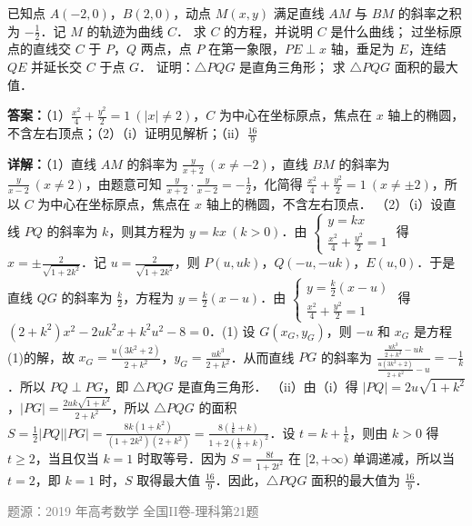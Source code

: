 \begin{question}
已知点 $A(-2,0)$，$B(2,0)$，动点 $M(x,y)$ 满足直线 $AM$ 与 $BM$ 的斜率之积为 $-\frac{1}{2}$．记 $M$ 的轨迹为曲线 $C$．
求 $C$ 的方程，并说明 $C$ 是什么曲线；
过坐标原点的直线交 $C$ 于 $P$，$Q$ 两点，点 $P$ 在第一象限，$PE\perp x$ 轴，垂足为 $E$，连结 $QE$ 并延长交 $C$ 于点 $G$．
证明：$\triangle PQG$ 是直角三角形；
求 $\triangle PQG$ 面积的最大值．
\begin{solution}
\textbf{答案：}（1）$\frac{x^2}{4}+\frac{y^2}{2}=1\ (|x|\neq 2)$，$C$ 为中心在坐标原点，焦点在 $x$ 轴上的椭圆，不含左右顶点；（2）（i）证明见解析；（ii）$\frac{16}{9}$

\textbf{详解：}（1）直线 $AM$ 的斜率为 $\frac{y}{x+2}\ (x\neq -2)$，直线 $BM$ 的斜率为 $\frac{y}{x-2}\ (x\neq 2)$，由题意可知 $\frac{y}{x+2}\cdot\frac{y}{x-2}=-\frac{1}{2}$，化简得 $\frac{x^2}{4}+\frac{y^2}{2}=1\ (x\neq\pm 2)$，所以 $C$ 为中心在坐标原点，焦点在 $x$ 轴上的椭圆，不含左右顶点．
（2）（i）设直线 $PQ$ 的斜率为 $k$，则其方程为 $y=kx\ (k>0)$．由 $\begin{cases} y=kx \\ \frac{x^2}{4}+\frac{y^2}{2}=1 \end{cases}$ 得 $x=\pm\frac{2}{\sqrt{1+2k^2}}$．记 $u=\frac{2}{\sqrt{1+2k^2}}$，则 $P(u,uk)$，$Q(-u,-uk)$，$E(u,0)$．于是直线 $QG$ 的斜率为 $\frac{k}{2}$，方程为 $y=\frac{k}{2}(x-u)$．由 $\begin{cases} y=\frac{k}{2}(x-u) \\ \frac{x^2}{4}+\frac{y^2}{2}=1 \end{cases}$ 得 $(2+k^2)x^2-2uk^2x+k^2u^2-8=0$．(1) 设 $G(x_G,y_G)$，则 $-u$ 和 $x_G$ 是方程(1)的解，故 $x_G=\frac{u(3k^2+2)}{2+k^2}$，$y_G=\frac{uk^3}{2+k^2}$．从而直线 $PG$ 的斜率为 $\frac{\frac{uk^3}{2+k^2}-uk}{\frac{u(3k^2+2)}{2+k^2}-u}=-\frac{1}{k}$．所以 $PQ\perp PG$，即 $\triangle PQG$ 是直角三角形．
（ii）由（i）得 $|PQ|=2u\sqrt{1+k^2}$，$|PG|=\frac{2uk\sqrt{1+k^2}}{2+k^2}$，所以 $\triangle PQG$ 的面积 $S=\frac{1}{2}|PQ||PG|=\frac{8k(1+k^2)}{(1+2k^2)(2+k^2)}=\frac{8(\frac{1}{k}+k)}{1+2(\frac{1}{k}+k)^2}$．设 $t=k+\frac{1}{k}$，则由 $k>0$ 得 $t\geq 2$，当且仅当 $k=1$ 时取等号．因为 $S=\frac{8t}{1+2t^2}$ 在 $[2,+\infty)$ 单调递减，所以当 $t=2$，即 $k=1$ 时，$S$ 取得最大值 $\frac{16}{9}$．因此，$\triangle PQG$ 面积的最大值为 $\frac{16}{9}$．

\textcolor{gray}{\footnotesize 题源：2019 年高考数学 全国II卷-理科第21题}
\end{solution}
\end{question}

